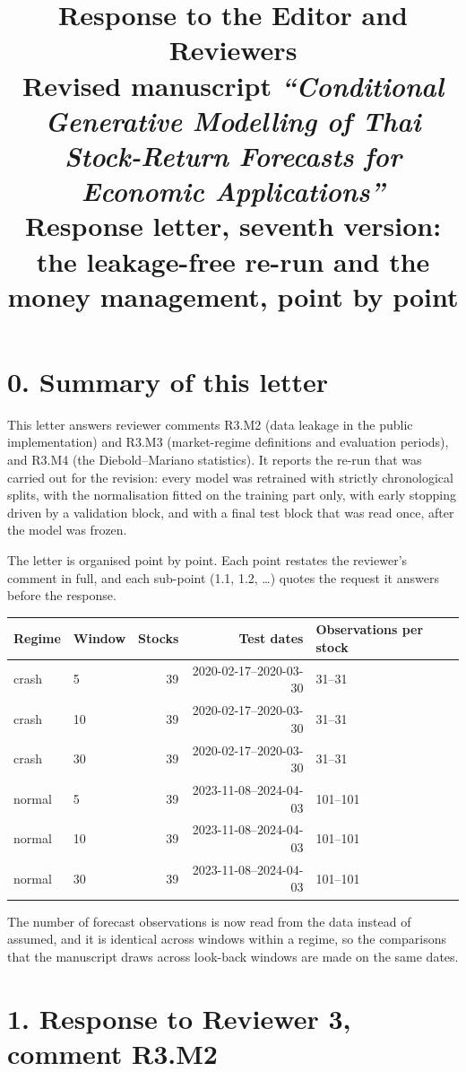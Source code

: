 \documentclass[11pt,a4paper]{article}
\title{\vspace{-2.2cm}\textbf{Response to the Editor and Reviewers}\\[0.35em]
  \large Revised manuscript \emph{``Conditional Generative Modelling of Thai Stock-Return Forecasts for Economic Applications''}\\[0.6em]
  \normalsize Response letter, seventh version: the leakage-free re-run and the money management, point by point}
\author{}
\date{}
\begin{document}
\maketitle

\section*{0. Summary of this letter}

This letter answers reviewer comments R3.M2 (data leakage in the public
implementation) and R3.M3 (market-regime definitions and evaluation
periods), and R3.M4 (the Diebold--Mariano statistics). It reports the
re-run that was carried out for
the revision: every model was retrained with strictly chronological splits,
with the normalisation fitted on the training part only, with early stopping
driven by a validation block, and with a final test block that was read
once, after the model was frozen.

The letter is organised point by point. Each point restates the
reviewer's comment in full, and each sub-point (1.1, 1.2, \dots) quotes the
request it answers before the response.

\begin{center}\small
\begin{tabular}{llrrl}
\toprule
Regime & Window & Stocks & Test dates & Observations per stock \\
\midrule
crash & 5 & 39 & 2020-02-17--2020-03-30 & 31--31 \\
crash & 10 & 39 & 2020-02-17--2020-03-30 & 31--31 \\
crash & 30 & 39 & 2020-02-17--2020-03-30 & 31--31 \\
normal & 5 & 39 & 2023-11-08--2024-04-03 & 101--101 \\
normal & 10 & 39 & 2023-11-08--2024-04-03 & 101--101 \\
normal & 30 & 39 & 2023-11-08--2024-04-03 & 101--101 \\
\bottomrule
\end{tabular}
\end{center}

The number of forecast observations is now read from the data instead of
assumed, and it is identical across windows within a regime, so the
comparisons that the manuscript draws across look-back windows are made
on the same dates.

\section*{1. Response to Reviewer 3, comment R3.M2}
\end{document}
